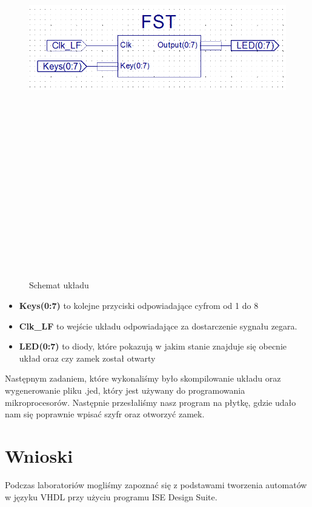 \documentclass[12pt,a4paper,titlepage]{article}
\begin{document}
\begin{figure}[H]
\centering
\includegraphics[angle=90,height=20cm]{fst.png}
\caption{Schemat układu}
\label{fig:schemat}
\end{figure}



\begin{itemize}
    \item \textbf{Keys(0:7)} to kolejne przyciski odpowiadające cyfrom od 1 do 8
    \item \textbf{Clk\_LF} to wejście układu odpowiadające za dostarczenie sygnału zegara.
    \item \textbf{LED(0:7)} to diody, które pokazują w jakim stanie znajduje się obecnie układ oraz czy zamek został otwarty
\end{itemize}
Następnym zadaniem, które wykonaliśmy było skompilowanie układu oraz wygenerowanie pliku .jed, który jest używany do programowania mikroprocesorów. Następnie przesłaliśmy nasz program na płytkę, gdzie udało nam się poprawnie wpisać szyfr oraz otworzyć zamek.

\section{Wnioski}
Podczas laboratoriów mogliśmy zapoznać się z podstawami tworzenia automatów w języku VHDL przy użyciu programu ISE Design Suite.
\end{document}
